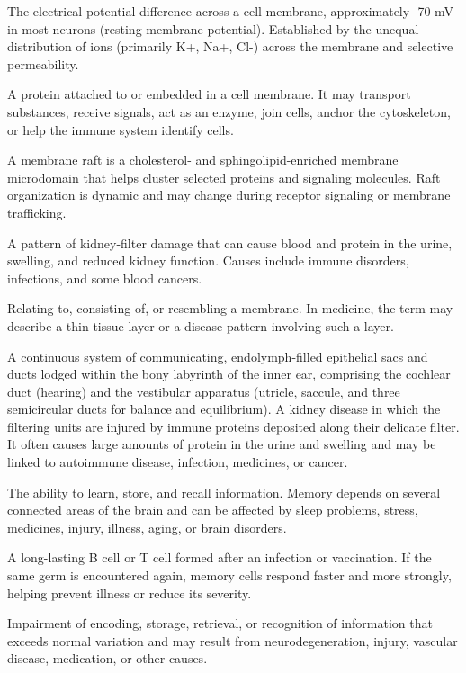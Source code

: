  The electrical potential difference across a cell membrane, approximately -70 mV in most
neurons (resting membrane potential). Established by the unequal distribution of ions
(primarily K+, Na+, Cl-) across the membrane and selective permeability.

 A protein attached to or embedded in a cell membrane. It may transport substances, receive signals, act as an enzyme, join cells, anchor the cytoskeleton, or help the immune system identify cells.

 A membrane raft is a cholesterol- and sphingolipid-enriched membrane microdomain that helps cluster selected proteins and signaling molecules. Raft organization is dynamic and may change during receptor signaling or membrane trafficking.

 A pattern of kidney-filter damage that can cause blood and protein in the urine, swelling, and reduced kidney function. Causes include immune disorders, infections, and some blood cancers.

 Relating to, consisting of, or resembling a membrane. In medicine, the term may describe a thin tissue layer or a disease pattern involving such a layer.

 A continuous system of communicating, endolymph-filled epithelial sacs and ducts lodged within the bony labyrinth of the inner ear, comprising the cochlear duct (hearing) and the vestibular apparatus (utricle, saccule, and three semicircular ducts for balance and equilibrium).
 A kidney disease in which the filtering units are injured by immune proteins deposited along their delicate filter. It often causes large amounts of protein in the urine and swelling and may be linked to autoimmune disease, infection, medicines, or cancer.

 The ability to learn, store, and recall information. Memory depends on several connected areas of the brain and can be affected by sleep problems, stress, medicines, injury, illness, aging, or brain disorders.

 A long-lasting B cell or T cell formed after an infection or vaccination. If the same germ is encountered again, memory cells respond faster and more strongly, helping prevent illness or reduce its severity.

 Impairment of encoding, storage, retrieval, or recognition of information that exceeds normal variation and may result from neurodegeneration, injury, vascular disease, medication, or other causes.

